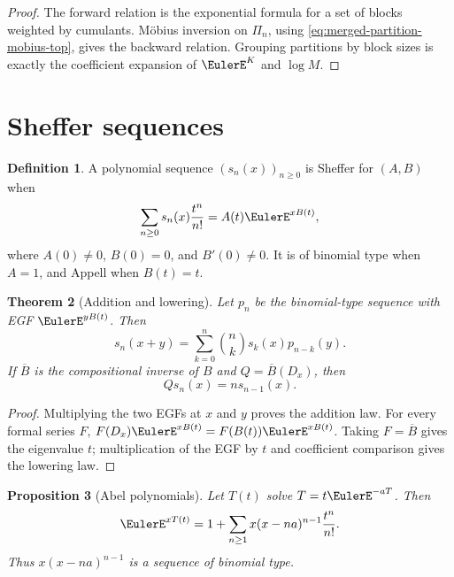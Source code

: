 \documentclass[11pt,a4paper,oneside,openany]{book}
\newtheorem{theorem}{Theorem}[chapter]
\newtheorem{proposition}[theorem]{Proposition}
\theoremstyle{definition}
\newtheorem{definition}[theorem]{Definition}
\theoremstyle{remark}
\begin{document}
\begin{proof}
The forward relation is the exponential formula for a set of blocks weighted
by cumulants.  Möbius inversion on $\Pi_n$, using
\eqref{eq:merged-partition-mobius-top}, gives the backward relation.  Grouping
partitions by block sizes is exactly the coefficient expansion of $\EulerE^K$ and
$\log M$.
\end{proof}

\section{Sheffer sequences}

\begin{definition}
A polynomial sequence $(s_n(x))_{n\geq0}$ is Sheffer for $(A,B)$ when
\begin{equation}
 \sum_{n\geq0}s_n(x)\frac{t^n}{n!}=A(t)\EulerE^{xB(t)},                   \label{eq:merged-sheffer-egf}
\end{equation}
where $A(0)\ne0$, $B(0)=0$, and $B'(0)\ne0$.  It is of binomial type when
$A=1$, and Appell when $B(t)=t$.
\end{definition}

\begin{theorem}[Addition and lowering]
\label{thm:merged-sheffer}
Let $p_n$ be the binomial-type sequence with EGF $\EulerE^{yB(t)}$.  Then
\begin{equation}
 s_n(x+y)=\sum_{k=0}^{n}\binom nk s_k(x)p_{n-k}(y).                 \label{eq:merged-sheffer-addition}
\end{equation}
If $\overline B$ is the compositional inverse of $B$ and
$Q=\overline B(D_x)$, then
\begin{equation}
 Qs_n(x)=ns_{n-1}(x).                                               \label{eq:merged-sheffer-lowering}
\end{equation}
\end{theorem}

\begin{proof}
Multiplying the two EGFs at $x$ and $y$ proves the addition law.  For every
formal series $F$,
$F(D_x)\EulerE^{xB(t)}=F(B(t))\EulerE^{xB(t)}$.  Taking $F=\overline B$ gives the
eigenvalue $t$; multiplication of the EGF by $t$ and coefficient comparison
gives the lowering law.
\end{proof}

\begin{proposition}[Abel polynomials]
\label{prop:merged-abel}
Let $T(t)$ solve $T=t \EulerE^{-aT}$.  Then
\begin{equation}
 \EulerE^{xT(t)}=1+\sum_{n\geq1}x(x-na)^{n-1}\frac{t^n}{n!}.              \label{eq:merged-abel-egf}
\end{equation}
Thus $x(x-na)^{n-1}$ is a sequence of binomial type.
\end{proposition}
\end{document}
